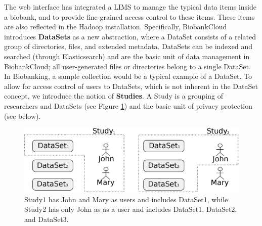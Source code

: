 The web interface has integrated a LIMS to manage the typical data items inside a biobank, and to provide fine-grained access control to these items. These items are also reflected in the Hadoop installation. Specifically, 
BiobankCloud introduces \textbf{DataSets} as a new abstraction, where a DataSet consists of a related group of directories, files, and extended metadata. DataSets can be indexed and searched (through Elasticsearch) and are the basic unit of data management in BiobankCloud; all user-generated files or directories belong to a single DataSet. In Biobanking, a sample collection would be a typical example of a DataSet.  To allow for access control of users to DataSets, which is not inherent in the DataSet concept, we introduce the notion of \textbf{Studies}. A Study is a grouping of researchers and DataSets (see Figure \ref{fig:studies}) and the basic unit of privacy protection (see below). 

\begin{figure}[h]
 \centering
 \includegraphics[scale=0.4]{./imgs/projects-as-groupings1.eps}
\caption{Study1 has John and Mary as users and includes DataSet1, while Study2 has only John as as a user and includes DataSet1, DataSet2, and DataSet3.}
\label{fig:studies}
\end{figure}


